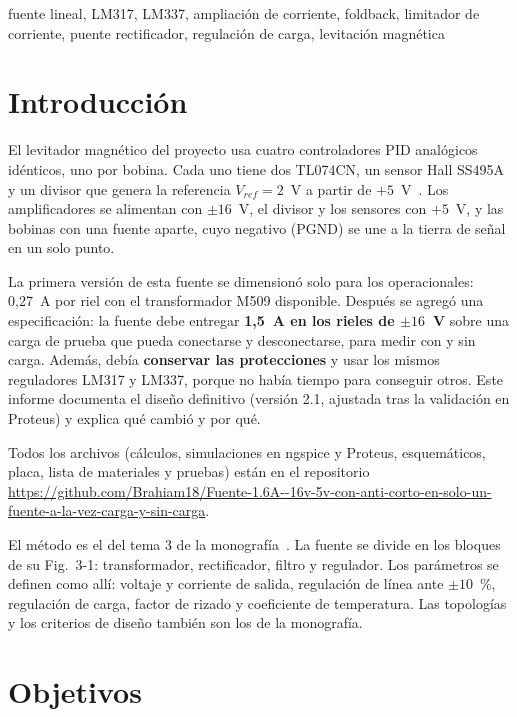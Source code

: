 \documentclass[conference]{IEEEtran}
\begin{document}
\begin{IEEEkeywords}
fuente lineal, LM317, LM337, ampliación de corriente, foldback, limitador de corriente, puente rectificador, regulación de carga, levitación magnética
\end{IEEEkeywords}

\section{Introducción}
El levitador magnético del proyecto usa cuatro controladores PID analógicos idénticos, uno por bobina. Cada uno tiene dos TL074CN, un sensor Hall SS495A y un divisor que genera la referencia $V_{ref}=2$~V a partir de $+5$~V~\cite{informepid}. Los amplificadores se alimentan con $\pm16$~V, el divisor y los sensores con $+5$~V, y las bobinas con una fuente aparte, cuyo negativo (PGND) se une a la tierra de señal en un solo punto.

La primera versión de esta fuente se dimensionó solo para los operacionales: 0,27~A por riel con el transformador M509 disponible. Después se agregó una especificación: la fuente debe entregar \textbf{1,5~A en los rieles de $\pm16$~V} sobre una carga de prueba que pueda conectarse y desconectarse, para medir con y sin carga. Además, debía \textbf{conservar las protecciones} y usar los mismos reguladores LM317 y LM337, porque no había tiempo para conseguir otros. Este informe documenta el diseño definitivo (versión 2.1, ajustada tras la validación en Proteus) y explica qué cambió y por qué.

Todos los archivos (cálculos, simulaciones en ngspice y Proteus, esquemáticos, placa, lista de materiales y pruebas) están en el repositorio \url{https://github.com/Brahiam18/Fuente-1.6A--16v-5v-con-anti-corto-en-solo-un-fuente-a-la-vez-carga-y-sin-carga}.

El método es el del tema 3 de la monografía~\cite{monografia}. La fuente se divide en los bloques de su Fig.~3-1: transformador, rectificador, filtro y regulador. Los parámetros se definen como allí: voltaje y corriente de salida, regulación de línea ante $\pm10$~\%, regulación de carga, factor de rizado y coeficiente de temperatura. Las topologías y los criterios de diseño también son los de la monografía.

\section{Objetivos}
\end{document}
